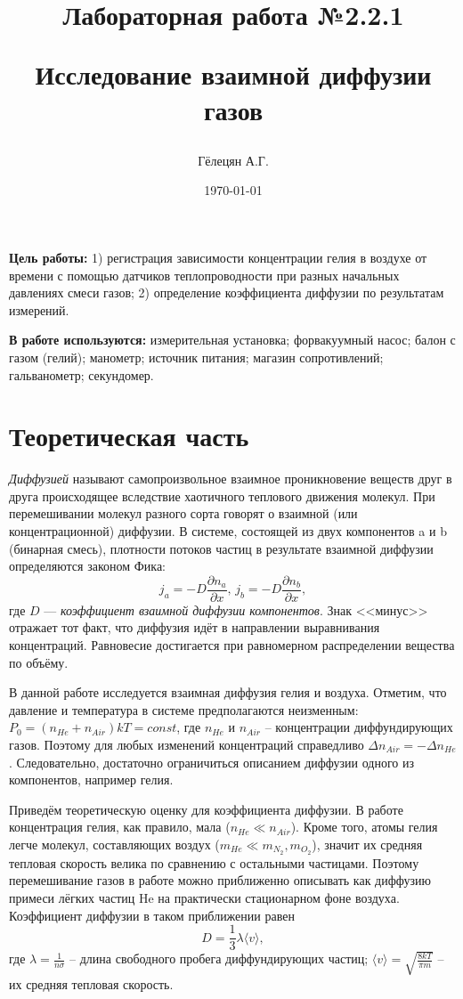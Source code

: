 \documentclass{article}
\title{\begin{center}Лабораторная работа №2.2.1\end{center}
Исследование взаимной диффузии газов}
\author{Гёлецян А.Г.}
\date{\today}
\begin{document}
    \maketitle
    \newpage

\textbf{Цель работы:} 1) регистрация зависимости концентрации гелия в воздухе от времени с помощью датчиков теплопроводности при разных начальных давлениях смеси газов; 2) определение коэффициента диффузии по результатам измерений.

\textbf{В работе используются:} измерительная установка; форвакуумный насос; балон с газом  (гелий); манометр; источник питания; магазин сопротивлений; гальванометр; секундомер.


\section{Теоретическая часть}
    \textit{Диффузией}  называют самопроизвольное взаимное проникновение веществ друг в друга происходящее вследствие хаотичного теплового движения молекул. При перемешивании молекул разного сорта говорят о взаимной (или концентрационной) диффузии. В системе, состоящей из двух компонентов a и b (бинарная смесь), плотности потоков частиц в результате взаимной диффузии определяются законом Фика:
    \begin{equation}
        j_a = -D \frac{\partial n_a}{\partial x}, \, j_b = -D \frac{\partial n_b}{\partial x},
    \end{equation}
    где $D$ — \textit{коэффициент взаимной диффузии компонентов}. Знак <<минус>> отражает тот факт, что диффузия идёт в направлении выравнивания концентраций. Равновесие достигается при равномерном распределении вещества по объёму.

    В данной работе исследуется взаимная диффузия гелия и воздуха. Отметим, что давление и температура в системе предполагаются неизменным: $P_0 = (n_{He}+n_{Air})kT = const$, где $n_{He}$  и $n_{Air}$ -- концентрации диффундирующих газов. Поэтому для любых изменений концентраций справедливо $\Delta n_{Air} = -\Delta n_{He}$. Следовательно, достаточно ограничиться описанием диффузии одного из компонентов, например гелия.

    Приведём теоретическую оценку для коэффициента диффузии. В работе концентрация гелия, как правило, мала ($n_{He} \ll n_{Air}$). Кроме того, атомы гелия легче молекул, составляющих воздух ($m_{He} \ll m_{N_2}, m_{O_2}$), значит их средняя тепловая скорость велика по сравнению с остальными частицами. Поэтому перемешивание газов в работе можно приближенно описывать как диффузию примеси лёгких частиц He на практически стационарном фоне воздуха. Коэффициент диффузии в таком приближении равен
    \begin{equation}
        \label{D}
        D = \frac{1}{3} \lambda \langle v \rangle,
    \end{equation}
    где $\lambda = \frac{1}{n\sigma}$ -- длина свободного пробега диффундирующих частиц; $\langle v \rangle = \sqrt{\frac{8kT}{\pi m}}$ -- их средняя тепловая скорость.
\end{document}
